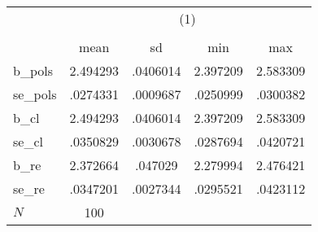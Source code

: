 {
\def\sym#1{\ifmmode^{#1}\else\(^{#1}\)\fi}
\begin{tabular}{l*{1}{cccc}}
\hline\hline
            &\multicolumn{4}{c}{(1)}                            \\
            &\multicolumn{4}{c}{}                               \\
            &        mean&          sd&         min&         max\\
\hline
b\_pols      &    2.494293&    .0406014&    2.397209&    2.583309\\
se\_pols     &    .0274331&    .0009687&    .0250999&    .0300382\\
b\_cl        &    2.494293&    .0406014&    2.397209&    2.583309\\
se\_cl       &    .0350829&    .0030678&    .0287694&    .0420721\\
b\_re        &    2.372664&     .047029&    2.279994&    2.476421\\
se\_re       &    .0347201&    .0027344&    .0295521&    .0423112\\
\hline
\(N\)       &         100&            &            &            \\
\hline\hline
\end{tabular}
}
